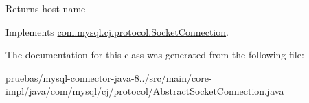 \begin{DoxyReturn}{Returns}
host name 
\end{DoxyReturn}


Implements \mbox{\hyperlink{interfacecom_1_1mysql_1_1cj_1_1protocol_1_1_socket_connection_a1fa2cc5cddf0b92a9f19472924aa6e61}{com.\+mysql.\+cj.\+protocol.\+Socket\+Connection}}.



The documentation for this class was generated from the following file\+:\begin{DoxyCompactItemize}
\item 
pruebas/mysql-\/connector-\/java-\/8../src/main/core-\/impl/java/com/mysql/cj/protocol/Abstract\+Socket\+Connection.\+java\end{DoxyCompactItemize}
